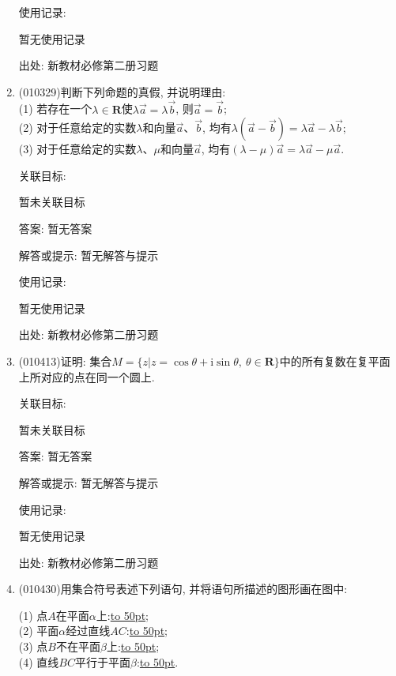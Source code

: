 \documentclass[10pt,a4paper]{article}
\newcommand{\blank}[1]{\underline{\hbox to #1pt{}}}
\begin{document}
\begin{enumerate}[1.]
使用记录:

暂无使用记录


出处: 新教材必修第二册习题
\item { (010329)}判断下列命题的真假, 并说明理由:\\
(1) 若存在一个$\lambda \in \mathbf{R}$使$\lambda \overrightarrow a=\lambda \overrightarrow b$, 则$\overrightarrow a=\overrightarrow b$;\\
(2) 对于任意给定的实数$\lambda$和向量$\overrightarrow a$、$\overrightarrow b$, 均有$\lambda (\overrightarrow a-\overrightarrow b)=\lambda \overrightarrow a-\lambda \overrightarrow b$;\\
(3) 对于任意给定的实数$\lambda$、$\mu$和向量$\overrightarrow a$, 均有$(\lambda -\mu)\overrightarrow a=\lambda \overrightarrow a-\mu\overrightarrow a$.


关联目标:

暂未关联目标

答案: 暂无答案

解答或提示: 暂无解答与提示

使用记录:

暂无使用记录


出处: 新教材必修第二册习题
\item { (010413)}证明: 集合$M=\{z|z=\cos \theta +\mathrm{i}\sin \theta,\ \theta \in \mathbf{R}\}$中的所有复数在复平面上所对应的点在同一个圆上.


关联目标:

暂未关联目标

答案: 暂无答案

解答或提示: 暂无解答与提示

使用记录:

暂无使用记录


出处: 新教材必修第二册习题
\item { (010430)}用集合符号表述下列语句, 并将语句所描述的图形画在图中:\\
\begin{center}
\end{center}
(1) 点$A$在平面$\alpha$上:\blank{50};\\
(2) 平面$\alpha$经过直线$AC$:\blank{50};\\
(3) 点$B$不在平面$\beta$上:\blank{50};\\
(4) 直线$BC$平行于平面$\beta$:\blank{50}.



\end{enumerate}
\end{document}
